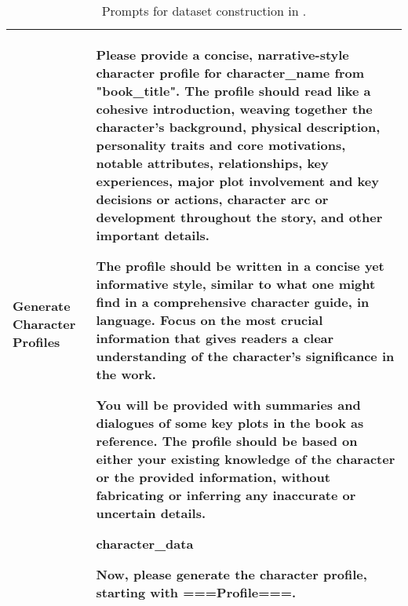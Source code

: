 \begin{table*}[h]
{\begin{tabular}{p{1in}|p{5.4in}}
\textbf{Generate Character Profiles} & 
Please provide a concise, narrative-style character profile for {character\_name} from "{book\_title}". The profile should read like a cohesive introduction, weaving together the character's background, physical description, personality traits and core motivations, notable attributes, relationships, key experiences, major plot involvement and key decisions or actions, character arc or development throughout the story, and other important details. 
    
The profile should be written in a concise yet informative style, similar to what one might find in a comprehensive character guide, in {language}. Focus on the most crucial information that gives readers a clear understanding of the character's significance in the work. 

You will be provided with summaries and dialogues of some key plots in the book as reference. The profile should be based on either your existing knowledge of the character or the provided information, without fabricating or inferring any inaccurate or uncertain details. 

{character\_data}

Now, please generate the character profile, starting with ===Profile===.
\\ 
\bottomrule

\end{tabular}}

\caption{Prompts for dataset construction in \method. }
\label{tab:prompts_data_3}
\end{table*}
